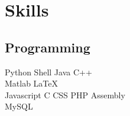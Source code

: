 \documentclass[]{deedy-resume-openfont}
\begin{document}
\begin{minipage}[t]{0.33\textwidth}

\section{Skills}
\subsection{Programming}
\textbullet{} Python \textbullet{}   Shell \textbullet{} Java \textbullet{} C++  \\
 \textbullet{} Matlab  \textbullet{} \LaTeX\ \\ 
\textbullet{} Javascript \textbullet{} C \textbullet{}  CSS \textbullet{} PHP \textbullet{} Assembly \\
 \textbullet{} MySQL
\sectionsep

%
%

\end{minipage} 
\hfill
\end{document}

